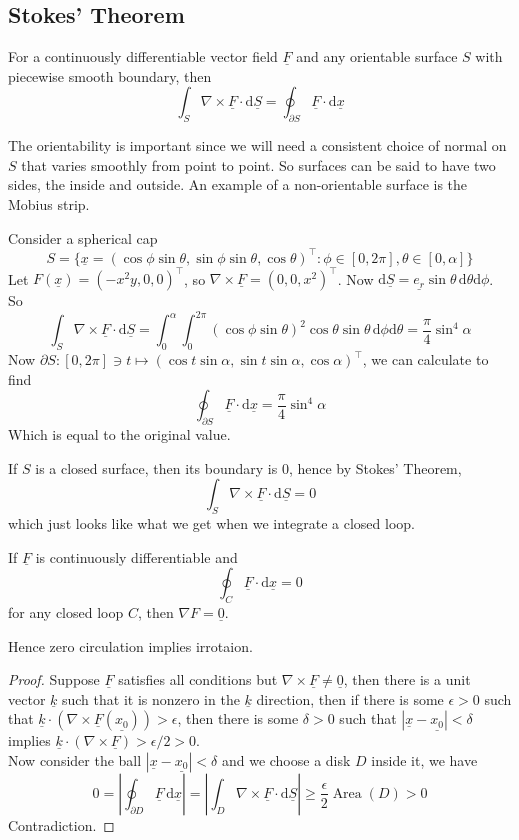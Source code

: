 \subsection{Stokes' Theorem}
\begin{proposition}
    For a continuously differentiable vector field $\underline{F}$ and any orientable surface $S$ with piecewise smooth boundary, then
    $$\int_S\nabla\times \underline{F}\cdot\mathrm d\underline{S}=\oint_{\partial S}\underline{F}\cdot\mathrm d\underline{x}$$
\end{proposition}
The orientability is important since we will need a consistent choice of normal on $S$ that varies smoothly from point to point.
So surfaces can be said to have two sides, the inside and outside.
An example of a non-orientable surface is the Mobius strip.
\begin{example}
    Consider a spherical cap
    $$S=\{\underline{x}=(\cos\phi\sin\theta,\sin\phi\sin\theta,\cos\theta)^\top:\phi\in[0,2\pi],\theta\in[0,\alpha]\}$$
    Let $F(\underline{x})=(-x^2y,0,0)^\top$, so $\nabla\times\underline{F}=(0,0,x^2)^\top$.
    Now $\mathrm d\underline{S}=\underline{e_r}\sin\theta\,\mathrm d\theta\mathrm d\phi$.
    So
    $$\int_S\nabla\times\underline{F}\cdot\mathrm d\underline{S}=\int_0^\alpha\int_0^{2\pi}(\cos\phi\sin\theta)^2\cos\theta\sin\theta\,\mathrm d\phi\mathrm d\theta=\frac{\pi}{4}\sin^4\alpha$$
    Now $\partial S:[0,2\pi]\ni t\mapsto (\cos t\sin\alpha,\sin t\sin\alpha,\cos\alpha)^\top$, we can calculate to find
    $$\oint_{\partial S}\underline{F}\cdot\mathrm d\underline{x}=\frac{\pi}{4}\sin^4\alpha$$
    Which is equal to the original value.
\end{example}
\begin{example}
    If $S$ is a closed surface, then its boundary is $0$, hence by Stokes' Theorem,
    $$\int_S\nabla \times\underline{F}\cdot\mathrm d\underline{S}=0$$
    which just looks like what we get when we integrate a closed loop.
\end{example}
\begin{proposition}
    If $\underline{F}$ is continuously differentiable and
    $$\oint_C\underline{F}\cdot\mathrm d\underline{x}=0$$
    for any closed loop $C$, then $\nabla F=\underline{0}$.
\end{proposition}
Hence zero circulation implies irrotaion.
\begin{proof}
    Suppose $\underline{F}$ satisfies all conditions but $\nabla\times\underline{F}\neq \underline{0}$, then there is a unit vector $\underline{k}$ such that it is nonzero in the $\underline{k}$ direction, then if there is some $\epsilon>0$ such that $\underline{k}\cdot(\nabla\times\underline{F}(\underline{x_0}))>\epsilon$, then there is some $\delta>0$ such that $|\underline{x}-\underline{x_0}|<\delta$ implies $\underline{k}\cdot(\nabla\times\underline{F})>\epsilon/2>0$.\\
    Now consider the ball $|\underline{x}-\underline{x_0}|<\delta$ and we choose a disk $D$ inside it, we have
    $$0=\left|\oint_{\partial D}\underline{F}\,\mathrm d\underline{x}\right|=\left|\int_D\nabla\times\underline{F}\cdot\mathrm d\underline{S}\right|\ge\frac{\epsilon}{2}\operatorname{Area}(D)>0$$
    Contradiction.
\end{proof}
